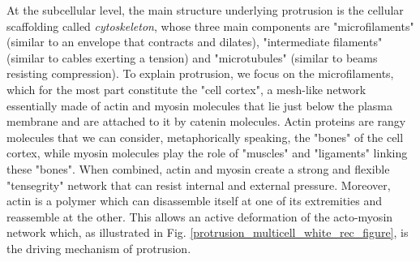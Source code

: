 At the subcellular level, the main structure underlying protrusion is the cellular scaffolding called \textit{cytoskeleton}, whose three main components are "microfilaments" (similar to an envelope that contracts and dilates), "intermediate filaments" (similar to cables exerting a tension) and "microtubules" (similar to beams resisting compression). To explain protrusion, we focus on the microfilaments, which for the most part constitute the "cell cortex", a mesh-like network essentially made of actin and myosin molecules that lie just below the plasma membrane and are attached to it by catenin molecules. Actin proteins are rangy molecules that we can consider, metaphorically speaking, the "bones" of the cell cortex, while myosin molecules play the role of "muscles" and "ligaments" linking these "bones". When combined, actin and myosin create a strong and flexible "tensegrity" network that can resist internal and external pressure. Moreover, actin is a polymer which can disassemble itself at one of its extremities and reassemble at the other. This allows an active deformation of the acto-myosin network which, as illustrated in Fig. \ref{protrusion_multicell_white_rec_figure}, is the driving mechanism of protrusion.
